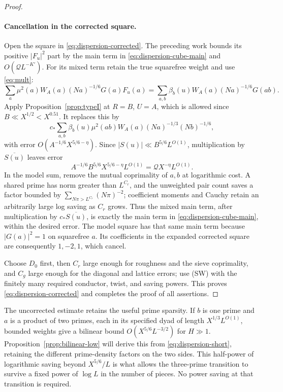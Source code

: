 \begin{proof}
\paragraph{Cancellation in the corrected square.}
Open the square in \eqref{eq:dispersion-corrected}. The preceding work
bounds its positive $|F_u|^2$ part by the main term in
\eqref{eq:dispersion-cube-main} and $O(\mathcal Q L^{-K'})$.
For its mixed term retain the true squarefree weight and use
\eqref{eq:mult}:
\[
 \sum_a\mu^2(a)W_A(a)(Na)^{-1/6}G(a)F_u(a)
 =\sum_{a,b}\beta_b(u)W_A(a)(Na)^{-1/6}G(ab).
\]
Apply Proposition~\ref{prop:typeI} at $R=B$, $U=A$, which is allowed
since $B\ll X^{1/2}<X^{0.51}$. It replaces this by
\[
 c_*\sum_{a,b}\beta_b(u)\mu^2(ab)
                  W_A(a)(Na)^{-1/3}(Nb)^{-1/6},
\]
with error $O(A^{-1/6}X^{5/6-\eta})$. Since
$|S(u)|\ll B^{5/6}L^{O(1)}$, multiplication by $\overline{S(u)}$
leaves error
\[
 A^{-1/6}B^{5/6}X^{5/6-\eta}L^{O(1)}
 =\mathcal Q X^{-\eta}L^{O(1)}.
\]
In the model sum, remove the mutual coprimality of $a,b$ at logarithmic
cost. A shared prime has norm greater than $L^{C_r}$, and the unweighted
pair count saves a factor bounded by
$\sum_{N\pi>L^{C_r}}(N\pi)^{-2}$; coefficient moments and Cauchy
retain an arbitrarily large log saving as $C_r$ grows. Thus the mixed
main term, after multiplication by $c_*\overline{S(u)}$, is exactly
the main term in \eqref{eq:dispersion-cube-main}, within the desired
error. The model square has that same main term because
$|G(a)|^2=1$ on squarefree $a$. Its coefficients in the expanded
corrected square are consequently $1,-2,1$, which cancel.

Choose $D_0$ first, then $C_r$ large enough for roughness and the sieve
coprimality, and $C_g$ large enough for the diagonal and lattice errors;
use (SW) with the finitely many required conductor, twist, and saving
powers. This proves \eqref{eq:dispersion-corrected} and completes the
proof of all assertions.
\end{proof}

\begin{remark}
\label{rem:dispersion-transition}
The uncorrected estimate retains the useful prime sparsity. If $b$ is
one prime and $a$ is a product of two primes, each in its specified dyad
of length $X^{1/3}L^{O(1)}$, bounded weights give a bilinear bound
$O(X^{5/6}L^{-3/2})$ for $H\gg1$. Proposition~\ref{prop:bilinear-low}
will derive this from \eqref{eq:dispersion-short}, retaining the
different prime-density factors on the two sides. This half-power
of logarithmic saving beyond $X^{5/6}/L$ is what allows the
three-prime transition to survive a fixed power of $\log L$ in the
number of pieces. No power saving at that transition is required.
\end{remark}
